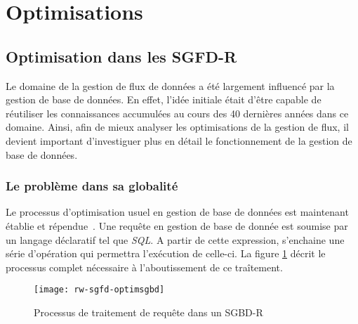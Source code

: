 \section{Optimisations}
\subsection{Optimisation dans les SGFD-R}
Le domaine de la gestion de flux de données a été largement influencé par la gestion de base de données. En effet, l'idée initiale était d'être capable de réutiliser les connaissances accumulées au cours des 40 dernières années dans ce domaine. Ainsi, afin de mieux analyser les optimisations de la gestion de flux, il devient important d'investiguer plus en détail le fonctionnement de la gestion de base de données.

\subsubsection{Le problème dans sa globalité}
Le processus d'optimisation usuel en gestion de base de données est maintenant établie et répendue~\cite{Ioannidis:optimization}. Une requête en gestion de base de donnée est soumise par un langage déclaratif tel que \textit{SQL}. A partir de cette expression, s'enchaine une série d'opération qui permettra l'exécution de celle-ci. La figure \ref{fig:rw:sgfd:optim:processus} décrit le processus complet nécessaire à l'aboutissement de ce traîtement. 
\begin{figure}[h]
\centering
\texttt{[image: rw-sgfd-optimsgbd]}
\caption{Processus de traitement de requête dans un SGBD-R}\label{fig:rw:sgfd:optim:processus}
\end{figure}

